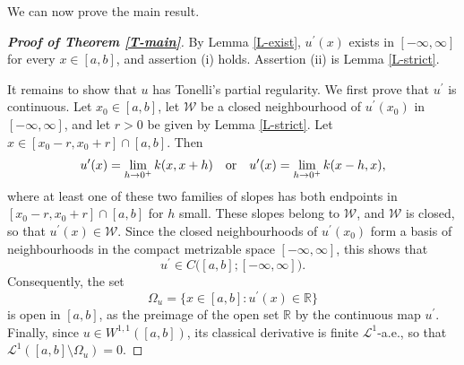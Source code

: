 \documentclass[reqno,12pt]{amsart}
\numberwithin{equation}{section}
\def\RR{{\mathds R}}
\theoremstyle{remark}
\begin{document}
We can now prove the main result.

\begin{proof}[\bf Proof of Theorem \ref{T-main}]
By Lemma \ref{L-exist}, $u^\prime(x)$ exists in $[-\infty,\infty]$ for every $x\in[a,b]$, and assertion (i) holds. Assertion (ii) is Lemma \ref{L-strict}.

\medskip

It remains to show that $u$ has Tonelli's partial regularity. We first prove that $u^\prime$ is continuous. Let $x_0\in[a,b]$, let $\mathcal{W}$ be a closed neighbourhood of $u^\prime(x_0)$ in $[-\infty,\infty]$, and let $r>0$ be given by Lemma \ref{L-strict}. Let $x\in[x_0-r,x_0+r]\cap[a,b]$. Then
\begin{equation*}
u^\prime(x)=\lim_{h\to0^+}k(x,x+h)\quad\hbox{or}\quad u^\prime(x)=\lim_{h\to0^+}k(x-h,x),
\end{equation*}
where at least one of these two families of slopes has both endpoints in $[x_0-r,x_0+r]\cap[a,b]$ for $h$ small. These slopes belong to $\mathcal{W}$, and $\mathcal{W}$ is closed, so that $u^\prime(x)\in\mathcal{W}$. Since the closed neighbourhoods of $u^\prime(x_0)$ form a basis of neighbourhoods in the compact metrizable space $[-\infty,\infty]$, this shows that
\begin{equation*}
u^\prime\in C\big([a,b];[-\infty,\infty]\big).
\end{equation*}
Consequently, the set
\begin{equation*}
\Omega_u=\big\{x\in[a,b]:u^\prime(x)\in\RR\big\}
\end{equation*}
is open in $[a,b]$, as the preimage of the open set $\RR$ by the continuous map $u^\prime$. Finally, since $u\in W^{1,1}([a,b])$, its classical derivative is finite $\mathcal{L}^1$-a.e., so that $\mathcal{L}^1([a,b]\setminus\Omega_u)=0$.
\end{proof}
\end{document}
